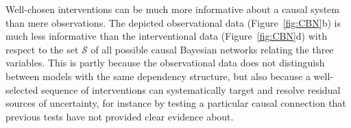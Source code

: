 \documentclass{cambridge7A}%
\newcommand{\ntodo}[2][]{\vspace{0.1cm} \hfil \todo[caption={\textbf{NB}}, size=\footnotesize, color = aliceblue, inline, #1]{#2}}
\newcommand{\ttodo}[2][]{\vspace{0.1cm} \hfil \todo[caption={\textbf{TG}}, size=\footnotesize, color = orange, inline, #1]{#2}}
\newcommand{\ww}{\mathbf{w}} %
\newcommand{\ca}{\mathbf{a}} %
\newcommand{\da}{\mathbf{d}} %
\begin{document}
Well-chosen interventions can be much more informative about a causal system than mere observations.  The depicted observational data (Figure~\ref{fig:CBN}b) is much less informative than the interventional data (Figure~\ref{fig:CBN}d) with respect to the set $\mathcal{S}$ of all possible causal Bayesian networks relating the three variables.  %
This is partly because the observational data does not distinguish between models with the same dependency structure, 
but also because a well-selected sequence of interventions can systematically target and resolve residual sources of uncertainty, for instance by testing a particular causal connection that previous tests have not provided clear evidence about.


\end{document}
